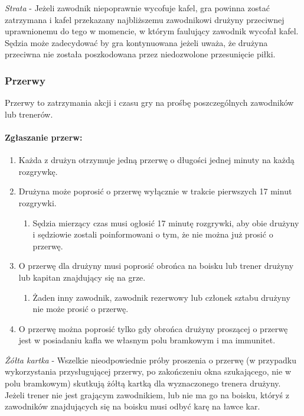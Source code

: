 \documentclass[12pt]{article}
\begin{document}
\emph{Strata} - Jeżeli zawodnik niepoprawnie wycofuje kafel, gra powinna
zostać zatrzymana i kafel przekazany najbliższemu zawodnikowi drużyny
przeciwnej uprawnionemu do tego w momencie, w którym faulujący zawodnik
wycofał kafel. Sędzia może zadecydować by gra kontynuowana jeżeli uważa,
że drużyna przeciwna nie została poszkodowana przez niedozwolone
przesunięcie piłki.

\subsubsection{Przerwy}

Przerwy to zatrzymania akcji i czasu gry na prośbę poszczególnych
zawodników lub trenerów.

\paragraph{Zgłaszanie przerw:}

\begin{enumerate}
\item
  Każda z drużyn otrzymuje jedną przerwę o długości jednej minuty na
  każdą rozgrywkę.
\item
  Drużyna może poprosić o przerwę wyłącznie w trakcie pierwszych 17
  minut rozgrywki.

  \begin{enumerate}
  \item
        Sędzia mierzący czas musi ogłosić 17 minutę rozgrywki, aby obie
    drużyny i sędziowie zostali poinformowani o tym, że nie można już
    prosić o przerwę.
      \end{enumerate}
\item
  O przerwę dla drużyny musi poprosić obrońca na boisku lub trener
  drużyny lub kapitan znajdujący się na grze.

  \begin{enumerate}
  \item
        Żaden inny zawodnik, zawodnik rezerwowy lub członek sztabu drużyny
    nie może prosić o przerwę.
      \end{enumerate}
\item
  O przerwę można poprosić tylko gdy obrońca drużyny proszącej o przerwę
  jest w posiadaniu kafla we własnym polu bramkowym i ma immunitet.
\end{enumerate}

\emph{Żółta kartka} - Wszelkie nieodpowiednie próby proszenia o przerwę
(w przypadku wykorzystania przysługującej przerwy, po zakończeniu okna
szukającego, nie w polu bramkowym) skutkują żółtą kartką dla
wyznaczonego trenera drużyny. Jeżeli trener nie jest grającym
zawodnikiem, lub nie ma go na boisku, któryś z zawodników znajdujących
się na boisku musi odbyć karę na ławce kar.
\end{document}
